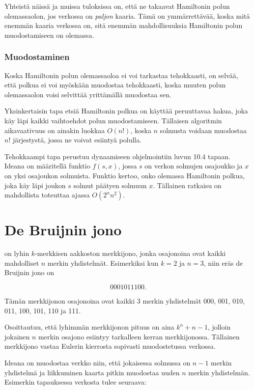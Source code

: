 Yhteistä näissä ja muissa tuloksissa on,
että ne takaavat Hamiltonin polun olemassaolon,
jos verkossa on \textit{paljon} kaaria.
Tämä on ymmärrettävää, koska mitä enemmän
kaaria verkossa on, sitä enemmän mahdollisuuksia
Hamiltonin polun muodostamiseen on olemassa.

\subsubsection{Muodostaminen}

Koska Hamiltonin polun olemassaoloa ei voi tarkastaa tehokkaasti,
on selvää, että polkua ei voi myöskään muodostaa tehokkaasti,
koska muuten polun olemassaolon voisi selvittää yrittämällä
muodostaa sen.

Yksinkertaisin tapa etsiä Hamiltonin polkua on käyttää
peruuttavaa hakua, joka käy läpi kaikki vaihtoehdot
polun muodostamiseen.
Tällaisen algoritmin aikavaativuus on ainakin luokkaa $O(n!)$,
koska $n$ solmusta voidaan muodostaa $n!$ järjestystä,
jossa ne voivat esiintyä polulla.

Tehokkaampi tapa perustuu dynaamiseen ohjelmointiin
luvun 10.4 tapaan.
Ideana on määritellä funktio $f(s,x)$,
jossa $s$ on verkon solmujen osajoukko ja
$x$ on yksi osajoukon solmuista.
Funktio kertoo, onko olemassa Hamiltonin polkua,
joka käy läpi joukon $s$ solmut päätyen solmuun $x$.
Tällainen ratkaisu on mahdollista toteuttaa ajassa $O(2^n n^2)$.

\section{De Bruijnin jono}


on lyhin $k$-merkkisen aakkoston merkkijono,
jonka osajonoina ovat kaikki mahdolliset
$n$ merkin yhdistelmät.
Esimerkiksi kun $k=2$ ja $n=3$,
niin eräs de Bruijnin jono on

\[0001011100.\]

Tämän merkkijonon osajonoina ovat kaikki 3 merkin yhdistelmät
000, 001, 010, 011, 100, 101, 110 ja 111.

Osoittautuu, että lyhimmän merkkijonon
pituus on aina $k^n+n-1$, jolloin jokainen
$n$ merkin osajono esiintyy tarkalleen
kerran merkkijonossa.
Tällainen merkkijono
vastaa Eulerin kierrosta sopivasti
muodostetussa verkossa.

Ideana on muodostaa verkko niin,
että jokaisessa solmussa on $n-1$
merkin yhdistelmä ja liikkuminen
kaarta pitkin muodostaa uuden
$n$ merkin yhdistelmän.
Esimerkin tapauksessa verkosta tulee seuraava:

